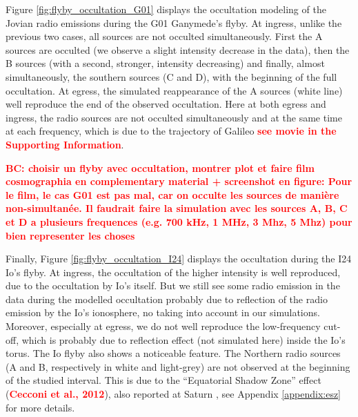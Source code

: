\documentclass[referee]{aa}
\newcommand{\tbd}[1]{\textcolor{red}{\textbf{#1}}}
\begin{document}
Figure \ref{fig:flyby_occultation_G01} displays the occultation modeling of the Jovian radio emissions during the G01 Ganymede's flyby. At ingress, unlike the previous two cases, all sources are not occulted simultaneously. First the A sources are occulted (we observe a slight intensity decrease in the data), then the B sources (with a second, stronger, intensity decreasing) and finally, almost simultaneously, the southern sources (C and D), with the beginning of the full occultation. At egress, the simulated reappearance of the A sources (white line) well reproduce the end of the observed occultation. Here at both egress and ingress, the radio sources are not occulted simultaneously and at the same time at each frequency, which is due to the trajectory of Galileo \tbd{see movie in the Supporting Information}.


\tbd{BC: choisir un flyby avec occultation, montrer plot et faire film cosmographia en complementary material + screenshot en figure: Pour le film, le cas G01 est pas mal, car on occulte les sources de manière non-simultanée. Il faudrait faire la simulation avec les sources A, B, C et D a plusieurs frequences (e.g. 700 kHz, 1 MHz, 3 Mhz, 5 Mhz) pour bien representer les choses}


Finally, Figure \ref{fig:flyby_occultation_I24} displays the occultation during the I24 Io's flyby. At ingress, the occultation of the higher intensity is well reproduced, due to the occultation by Io's itself. But we still see some radio emission in the data during the modelled occultation probably due to reflection of the radio emission by the Io's ionosphere, no taking into account in our simulations. Moreover, especially at egress, we do not well reproduce the low-frequency cut-off, which is probably due to reflection effect (not simulated here) inside the Io's torus. The Io flyby also shows a noticeable feature. The Northern radio sources (A and B, respectively in white and light-grey) are not observed at the beginning of the studied interval. This is due to the ``Equatorial Shadow Zone'' effect (\tbd{Cecconi et al., 2012}), also reported at Saturn \citep{lamy_JGR_08b}, see Appendix \ref{appendix:esz} for more details. 


\end{document}
